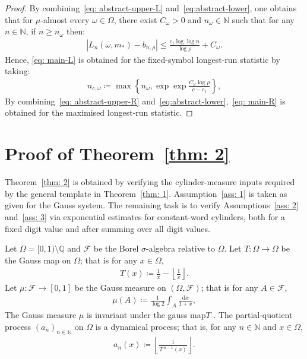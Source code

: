 \documentclass[12pt,reqno]{amsart}
\theoremstyle{definition}
\theoremstyle{plain}
\begin{document}
\begin{proof}
By combining~\eqref{eq: abstract-upper-L} and~\eqref{eq:abstract-lower}, one obtains that for $\mu$-almost every $\omega\in\Omega$, there exist $C_\omega>0$ and $n_\omega\in\mathbb{N}$ such that for any $n\in\mathbb{N}$, if $n\geq n_\omega$ then:
\begin{align*}
    \left |L_n(\omega,m_*)-b_{n,\rho}\right|
    \leq \frac{c_1\log{\log{n}}}{\log{\rho}} + C_\omega.
\end{align*}
Hence, \eqref{eq: main-L} is obtained for the fixed-symbol longest-run statistic by taking:
\begin{align*}
    n_{c,\omega}\coloneqq\max{\left\{n_\omega,
    \exp{\exp{\frac{C_\omega\log{\rho}}{c-c_1}}}\right\}},
\end{align*}
By combining~\eqref{eq: abstract-upper-R} and~\eqref{eq:abstract-lower},~\eqref{eq: main-R} is obtained for the maximised longest-run statistic.
\end{proof}

\section{Proof of Theorem~\ref{thm: 2}}

Theorem~\ref{thm: 2} is obtained by verifying the cylinder-measure inputs required by the general template in Theorem~\ref{thm: 1}. Assumption~\ref{ass: 1} is taken as given for the Gauss system. The remaining task is to verify Assumptions~\ref{ass: 2} and~\ref{ass: 3} via exponential estimates for constant-word cylinders, both for a fixed digit value and after summing over all digit values.

Let $\Omega=[0,1)\setminus\mathbb{Q}$ and $\mathcal{F}$ be the Borel $\sigma$-algebra relative to $\Omega$. Let $T:\Omega\to\Omega$ be the Gauss map on $\Omega$; that is for any $x\in\Omega$,
\begin{align*}
    T(x)\coloneqq\frac{1}{x}-\left\lfloor\frac{1}{x}\right\rfloor.
\end{align*}
Let $\mu:\mathcal{F}\to[0,1]$ be the Gauss measure on $(\Omega,\mathcal{F})$; that is for any $A\in\mathcal{F}$,
\begin{align}\label{eq: 16}
    \mu{(A)}\coloneqq\frac{1}{\log 2}\int_A\frac{\mathrm{d}x}{1+x},
\end{align}
The Gauss measure $\mu$ is invariant under the gauss map$T$ \cite[\S 15]{Khinchin1964ContinuedFractions}. The partial-quotient process $(a_n)_{n\in\mathbb{N}}$ on $\Omega$ is a dynamical process; that is, for any $n\in\mathbb{N}$ and $x\in\Omega$, 
\begin{align*}
    a_n(x)
    \coloneqq \left\lfloor \frac{1}{T^{\,n-1}(x)}\right\rfloor.
\end{align*}
\end{document}
